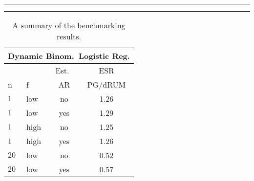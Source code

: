 \documentclass[12pt]{article}
\begin{document}
\begin{table}

  \begin{center}
    \caption{\label{tab:benchmark-summary} A summary of the benchmarking results.}
    \hrule
    \vspace{2pt}
    \hrule
  \end{center}
  \begin{center}
    \small
    \begin{tabular}{l l c c}
      \multicolumn{4}{c}{Dynamic Binom.\ Logistic Reg.} \\
      \hline
      & & Est.\ & ESR \\
      n & f & AR & PG/dRUM \\
      \hline
      $1$ & low & no & 1.26 \\
      $1$ & low & yes & 1.29 \\

      $1$ & high & no & 1.25 \\
      $1$ & high & yes & 1.26 \\

      $20$ & low & no & 0.52 \\
      $20$ & low & yes & 0.57 \\


\end{tabular}
\end{center}
\end{table}
\end{document}
